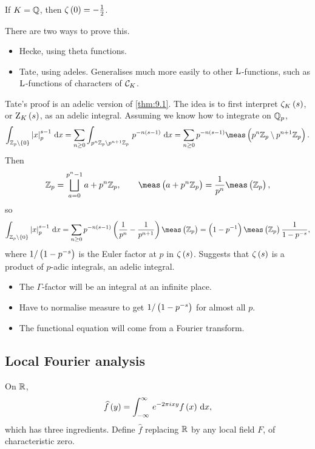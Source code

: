 \begin{example*}
If $ K = \mathbb{Q} $, then $ \zeta\br{0} = -\tfrac{1}{2} $.
\end{example*}

There are two ways to prove this.
\begin{itemize}
\item Hecke, using theta functions.
\item Tate, using adeles. Generalises much more easily to other $ \mathrm{L} $-functions, such as $ \mathrm{L} $-functions of characters of $ \mathcal{C}_K $.
\end{itemize}

\pagebreak

Tate's proof is an adelic version of \ref{thm:9.1}. The idea is to first interpret $ \zeta_K\br{s} $, or $ \Z_K\br{s} $, as an adelic integral. Assuming we know how to integrate on $ \mathbb{Q}_p $,
$$ \intd{\ZZ_p \setminus \cbr{0}}{}{\abs{x}_p^{s - 1}}{x} = \sum_{n \ge 0} \intd{p^n\ZZ_p \setminus p^{n + 1}\ZZ_p}{}{p^{-n\br{s - 1}}}{x} = \sum_{n \ge 0} p^{-n\br{s - 1}}\meas\br{p^n\ZZ_p \setminus p^{n + 1}\ZZ_p}. $$
Then
$$ \ZZ_p = \bigsqcup_{a = 0}^{p^n - 1} a + p^n\ZZ_p, \qquad \meas\br{a + p^n\ZZ_p} = \dfrac{1}{p^n}\meas\br{\ZZ_p}, $$
so
$$ \intd{\ZZ_p \setminus \cbr{0}}{}{\abs{x}_p^{s - 1}}{x} = \sum_{n \ge 0} p^{-n\br{s - 1}}\br{\dfrac{1}{p^n} - \dfrac{1}{p^{n + 1}}}\meas\br{\ZZ_p} = \br{1 - p^{-1}}\meas\br{\ZZ_p}\dfrac{1}{1 - p^{-s}}, $$
where $ 1 / \br{1 - p^{-s}} $ is the Euler factor at $ p $ in $ \zeta\br{s} $. Suggests that $ \zeta\br{s} $ is a product of $ p $-adic integrals, an adelic integral.
\begin{itemize}
\item The $ \Gamma $-factor will be an integral at an infinite place.
\item Have to normalise measure to get $ 1 / \br{1 - p^{-s}} $ for almost all $ p $.
\item The functional equation will come from a Fourier transform.
\end{itemize}

\subsection{Local Fourier analysis}

On $ \mathbb{R} $,
$$ \widehat{f}\br{y} = \intd{-\infty}{\infty}{e^{-2\pi ixy}f\br{x}}{x}, $$
which has three ingredients. Define $ \widehat{f} $ replacing $ \mathbb{R} $ by any local field $ F $, of characteristic zero.

